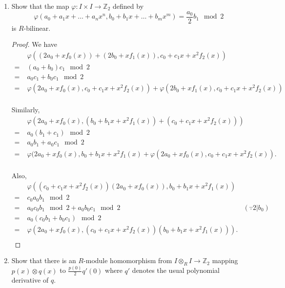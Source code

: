 \documentclass{article}
\begin{document}
  \begin{enumerate}[label={(\alph*)}]
    \item Show that the map $\varphi:I\times I\rightarrow\mathbb{Z}_2$
      defined by
      \[\varphi(a_0+a_1x+\ldots+a_nx^n, b_0+b_1x+\ldots+b_mx^m)
      =\frac{a_0}{2}b_1\mod{2}\]
      is $R$-bilinear.

      \begin{proof}
        We have
        \begin{align*}
          &\;\varphi((2a_0+xf_0(x))+(2b_0+xf_1(x)), c_0+c_1x+x^2f_2(x))\\
          =&\;(a_0+b_0)c_1\mod{2}\\
          =&\;a_0c_1+b_0c_1\mod{2}\\
          =&\;\varphi(2a_0+xf_0(x), c_0+c_1x+x^2f_2(x))
            +\varphi(2b_0+xf_1(x), c_0+c_1x+x^2f_2(x))\\
        \end{align*}

        Similarly,
        \begin{align*}
          &\;\varphi(2a_0+xf_0(x), (b_0+b_1x+x^2f_1(x))
            +(c_0+c_1x+x^2f_2(x)))\\
          =&\;a_0(b_1+c_1)\mod{2}\\
          =&\;a_0b_1+a_0c_1\mod{2}\\
          =&\;\varphi(2a_0+xf_0(x), b_0+b_1x+x^2f_1(x)
            +\varphi(2a_0+xf_0(x), c_0+c_1x+x^2f_2(x)).\\
        \end{align*}

        Also,
        \begin{align*}
          &\;\varphi((c_0+c_1x+x^2f_2(x))(2a_0+xf_0(x)),
            b_0+b_1x+x^2f_1(x))\\
          =&\;c_0a_0b_1\mod{2}\\
          =&\;a_0c_0b_1\mod{2} +a_0b_0c_1\mod{2} &(\because 2|b_0)\\
          =&\;a_0(c_0b_1+b_0c_1)\mod{2}\\
          =&\;\varphi(2a_0+xf_0(x),
            (c_0+c_1x+x^2f_2(x))(b_0+b_1x+x^2f_1(x))).\\
        \end{align*}
      \end{proof}

    \item Show that there is an $R$-module homomorphism from $I\otimes_R
      I\rightarrow\mathbb{Z}_2$ mapping $p(x)\otimes q(x)$ to
      $\frac{p(0)}{2}q'(0)$ where $q'$ denotes the usual polynomial
      derivative of $q$.


\end{enumerate}
\end{document}
